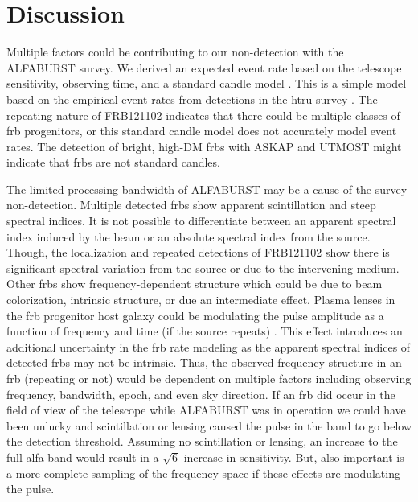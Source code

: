 \documentclass[a4paper,fleqn,usenatbib]{mnras}
\begin{document}
\section{Discussion}
\label{sec:discuss}

Multiple factors could be contributing to our non-detection with the ALFABURST
survey. We derived an expected event rate based on the telescope sensitivity,
observing time, and a standard candle model \citep{2013MNRAS.436L...5L}. This is
a simple model based on the empirical event rates from detections in the
\gls{htru} survey \citep{2013Sci...341...53T}. The repeating nature of
FRB121102 indicates that there could be multiple classes of \gls{frb}
progenitors, or this standard candle model does not accurately model event
rates. The detection of bright, high-DM \glspl{frb} with ASKAP
\citep{2017ApJ...841L..12B} and UTMOST \citep{2017MNRAS.468.3746C,atel10697}
might indicate that \glspl{frb} are not standard candles.

The limited processing bandwidth of ALFABURST may be a cause of the survey
non-detection. Multiple detected \glspl{frb} show apparent scintillation and
steep spectral indices. It is not possible to differentiate between an apparent
spectral index induced by the beam or an absolute spectral index from the
source. Though, the localization and repeated detections of FRB121102 show
there is significant spectral variation from the source or due to the
intervening medium. Other \glspl{frb} show frequency-dependent structure which
could be due to beam colorization, intrinsic structure, or due an intermediate
effect. Plasma lenses in the \gls{frb} progenitor host galaxy could be
modulating the pulse amplitude as a function of frequency and time (if the
source repeats) \citep{2017ApJ...842...35C}. This effect introduces an additional 
uncertainty in the \gls{frb} rate modeling as the apparent spectral indices of detected
\glspl{frb} may not be intrinsic. Thus, the observed frequency structure in an
\gls{frb} (repeating or not) would be dependent on multiple factors including observing
frequency, bandwidth, epoch, and even sky direction. If an \gls{frb} did occur in the
field of view of the telescope while ALFABURST was in operation we could have
been unlucky and scintillation or lensing caused the pulse in the band to go
below the detection threshold. Assuming no scintillation or lensing, an
increase to the full \gls{alfa} band would result in a $\sqrt{6}$ increase in
sensitivity. But, also important is a more complete sampling of the frequency
space if these effects are modulating the pulse.
\end{document}

